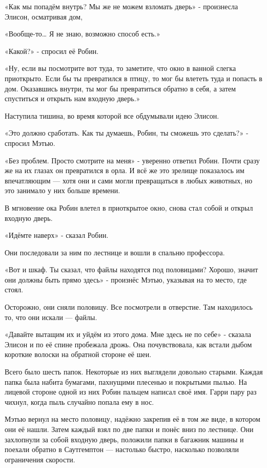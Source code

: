 \documentclass[a4paper,12pt]{book}
\begin{document}
\par
«Как мы попадём внутрь? Мы же не можем взломать дверь» - произнесла Элисон, осматривая дом,
\par
«Вообще-то… Я не знаю, возможно способ есть.»
\par
«Какой?» - спросил её Робин.
\par
«Ну, если вы посмотрите вот туда, то заметите, что окно в ванной слегка приоткрыто. Если бы ты превратился в птицу, то мог бы влететь туда и попасть в дом. Оказавшись внутри, ты мог бы превратиться обратно в себя, а затем спуститься и открыть нам входную дверь.»
\par
Наступила тишина, во время которой все обдумывали идею Элисон.
\par
«Это должно сработать. Как ты думаешь, Робин, ты сможешь это сделать?» - спросил Мэтью.
\par
«Без проблем. Просто смотрите на меня» - уверенно ответил Робин. Почти сразу же на их глазах он превратился в орла. И всё же это зрелище показалось им впечатляющим — хотя они и сами могли превращаться в любых животных, но это занимало у них больше времени.
\par
В мгновение ока Робин влетел в приоткрытое окно, снова стал собой и открыл входную дверь.
\par
«Идёмте наверх» - сказал Робин.
\par
Они последовали за ним по лестнице и вошли в спальню профессора.
\par
«Вот и шкаф. Ты сказал, что файлы находятся под половицами? Хорошо, значит они должны быть прямо здесь» - произнёс Мэтью, указывая на то место, где стоял.
\par
Осторожно, они сняли половицу. Все посмотрели в отверстие. Там находилось то, что они искали — файлы.
\par
«Давайте вытащим их и уйдём из этого дома. Мне здесь не по себе» - сказала Элисон и по её спине пробежала дрожь. Она почувствовала, как встали дыбом короткие волоски на обратной стороне её шеи.
\par
Всего было шесть папок. Некоторые из них выглядели довольно старыми. Каждая папка была набита бумагами, пахнущими плесенью и покрытыми пылью. На лицевой стороне одной из них Робин пальцем написал своё имя. Гарри пару раз чихнул, когда пыль случайно попала ему в нос.
\par
Мэтью вернул на место половицу, надёжно закрепив её в том же виде, в котором они её нашли. Затем каждый взял по две папки и понёс вниз по лестнице. Они захлопнули за собой входную дверь, положили папки в багажник машины и поехали обратно в Саутгемптон — настолько быстро, насколько позволяли ограничения скорости.\\
\end{document}
